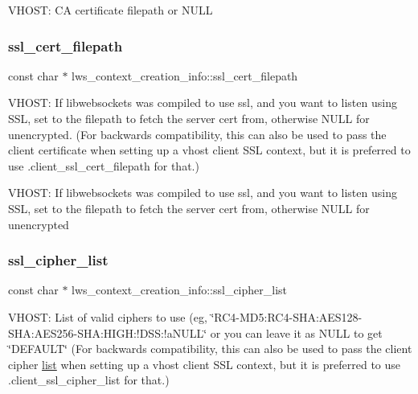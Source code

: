 V\+H\+O\+ST\+: CA certificate filepath or N\+U\+LL \mbox{\label{structlws__context__creation__info_a0ebe001c71365426d112977874bfded1}} 
\subsubsection{\texorpdfstring{ssl\+\_\+cert\+\_\+filepath}{ssl\_cert\_filepath}}
{\footnotesize\ttfamily const char $\ast$ lws\+\_\+context\+\_\+creation\+\_\+info\+::ssl\+\_\+cert\+\_\+filepath}

V\+H\+O\+ST\+: If libwebsockets was compiled to use ssl, and you want to listen using S\+SL, set to the filepath to fetch the server cert from, otherwise N\+U\+LL for unencrypted. (For backwards compatibility, this can also be used to pass the client certificate when setting up a vhost client S\+SL context, but it is preferred to use .client\+\_\+ssl\+\_\+cert\+\_\+filepath for that.)

V\+H\+O\+ST\+: If libwebsockets was compiled to use ssl, and you want to listen using S\+SL, set to the filepath to fetch the server cert from, otherwise N\+U\+LL for unencrypted \mbox{\label{structlws__context__creation__info_aeae5fe9ccc9b0ec6313a4bbf371f302a}} 
\subsubsection{\texorpdfstring{ssl\+\_\+cipher\+\_\+list}{ssl\_cipher\_list}}
{\footnotesize\ttfamily const char $\ast$ lws\+\_\+context\+\_\+creation\+\_\+info\+::ssl\+\_\+cipher\+\_\+list}

V\+H\+O\+ST\+: List of valid ciphers to use (eg, \char`\"{}\+R\+C4-\/\+M\+D5\+:\+R\+C4-\/\+S\+H\+A\+:\+A\+E\+S128-\/\+S\+H\+A\+:\+A\+E\+S256-\/\+S\+H\+A\+:\+H\+I\+G\+H\+:!\+D\+S\+S\+:!a\+N\+U\+L\+L\char`\"{} or you can leave it as N\+U\+LL to get \char`\"{}\+D\+E\+F\+A\+U\+L\+T\char`\"{} (For backwards compatibility, this can also be used to pass the client cipher \hyperlink{protocollist-p}{list} when setting up a vhost client S\+SL context, but it is preferred to use .client\+\_\+ssl\+\_\+cipher\+\_\+list for that.)

